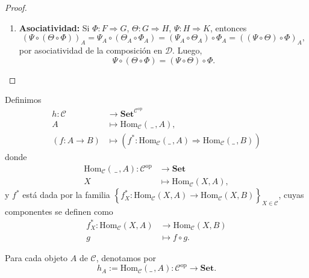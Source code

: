 \begin{proof}
\begin{enumerate}
		\noindent Por lo tanto,
		\[
		\Phi \circ \mathrm{id}_F = \Phi \quad \text{y} \quad \mathrm{id}_F \circ \Psi = \Psi.
		\]
	
		\item \textbf{Asociatividad:} Si \(\Phi : F \Rightarrow G\), \(\Theta : G \Rightarrow H\), \(\Psi : H \Rightarrow K\), entonces
		\[
		(\Psi \circ (\Theta \circ \Phi))_A = \Psi_A \circ (\Theta_A \circ \Phi_A) = (\Psi_A \circ \Theta_A) \circ \Phi_A = ((\Psi \circ \Theta) \circ \Phi)_A,
		\]
		por asociatividad de la composición en \(\mathcal{D}\). Luego,
		\[
		\Psi \circ (\Theta \circ \Phi) = (\Psi \circ \Theta) \circ \Phi.
		\]
	\end{enumerate}
\end{proof}
  
 
 

 
 
 
 
 
 
 \noindent Definimos 
 \begin{align*}
 	h : \mathcal{C} &\longrightarrow \mathbf{Set}^{\mathcal{C}^{\mathrm{op}}} \\
 	A &\longmapsto \mathrm{Hom}_{\mathcal{C}}(\,\_\,, A),\\
 	\left(f:A\to B\right)&\longmapsto \left( f^\ast: \mathrm{Hom}_{\mathcal{C}}(\_\,,A) \Longrightarrow \mathrm{Hom}_{\mathcal{C}}(\_\,,B)\right)
 \end{align*}
 donde 
 \begin{align*}
 	\mathrm{Hom}_{\mathcal{C}}(\,\_\,, A) : \mathcal{C}^{\mathrm{op}} &\longrightarrow \mathbf{Set} \\
 	X &\longmapsto \mathrm{Hom}_{\mathcal{C}}(X, A),
 \end{align*}
 y \(f^\ast\) está dada por la familia \(\left\{f^\ast_{X}: \mathrm{Hom}_{\mathcal{C}}(X,A)\to \mathrm{Hom}_{\mathcal{C}}(X,B)\right\}_{X \in \mathcal{C}}\), cuyas componentes se definen como
 \begin{align*}
 	f^\ast_X: \mathrm{Hom}_{\mathcal{C}}(X,A) &\longrightarrow \mathrm{Hom}_{\mathcal{C}}(X,B) \\
 	g &\longmapsto f \circ g.
 \end{align*}
 
 
 
 
 
 
 
 
 \noindent
 Para cada objeto \(A\) de \(\mathcal{C}\), denotamos por
 \[
 h_A := \mathrm{Hom}_{\mathcal{C}}(\_\,, A) : \mathcal{C}^{\mathrm{op}} \longrightarrow \mathbf{Set}.
 \]
 
